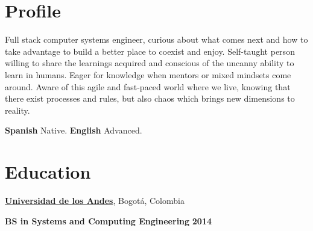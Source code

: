\section{Profile}
Full stack computer systems engineer, curious about what comes next and how to
take advantage to build a better place to coexist and enjoy.
Self-taught person willing to share
the learnings acquired and
conscious of the uncanny ability to learn in humans. Eager for knowledge when
mentors or mixed mindsets come around.
Aware of this agile and fast-paced world where we live, knowing that there exist
processes and rules, but also chaos which brings new dimensions to reality.

\vspace{3.5mm}
\textbf{Spanish} Native. \textbf{English} Advanced.
%

%

\section{Education}
%
% 
% 
\href{http://www.topuniversities.com/node/2823/ranking-details/latin-american-university-rankings/2014}{\textbf{Universidad de los Andes}},
Bogot\'{a}, Colombia
\begin{outerlist}
\item[\FA \faAngleDoubleRight] \textbf{BS in Systems and Computing Engineering}
\hfill \textbf{2014}
\end{outerlist}

